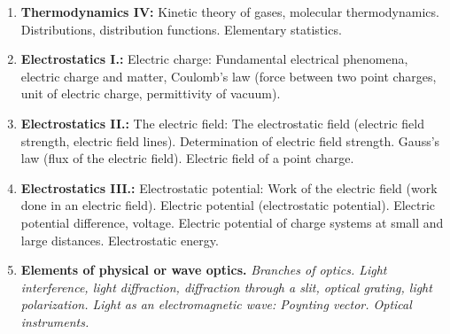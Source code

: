 \documentclass[t,aspectratio=169]{beamer}
\begin{document}
\begin{frame}
\begin{enumerate}
\item \textbf{Thermodynamics IV:} Kinetic theory of gases, molecular thermodynamics. Distributions, distribution functions. Elementary statistics.
\item \textbf{Electrostatics I.:} Electric charge: Fundamental electrical phenomena, electric charge and matter, Coulomb’s law (force between two point charges, unit of electric charge, permittivity of vacuum).
\item \textbf{Electrostatics II.:} The electric field: The electrostatic field (electric field strength, electric field lines). Determination of electric field strength. Gauss’s law (flux of the electric field). Electric field of a point charge.
\pagebreak
\item \textbf{Electrostatics III.:} Electrostatic potential: Work of the electric field (work done in an electric field). Electric potential (electrostatic potential). Electric potential difference, voltage. Electric potential of charge systems at small and large distances. Electrostatic energy.
\item \textbf{Elements of physical or wave optics.} \textit{Branches of optics. Light interference, light diffraction, diffraction through a slit, optical grating, light polarization. Light as an electromagnetic wave: Poynting vector. Optical instruments.}
\end{enumerate}
\end{frame}

\end{document}
